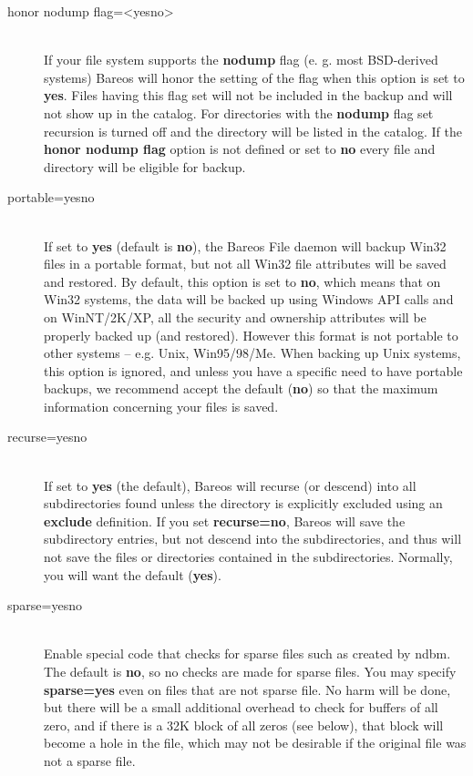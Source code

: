 \begin{description}
\item [honor nodump flag={\textless}yes{\textbar}no{\textgreater}] \hfill \\
   If your file system supports the {\bf nodump} flag (e. g. most
   BSD-derived systems) Bareos will honor the setting of the flag
   when this option is set to {\bf yes}. Files having this flag set
   will not be included in the backup and will not show up in the
   catalog. For directories with the {\bf nodump} flag set recursion
   is turned off and the directory will be listed in the catalog.
   If the {\bf honor nodump flag} option is not defined
   or set to {\bf no} every file and directory will be eligible for
   backup.

\label{portable}
\item [portable=yes{\textbar}no] \hfill \\
   If set to {\bf yes} (default is {\bf no}), the Bareos File daemon will
   backup Win32 files in a portable format, but not all Win32 file
   attributes will be saved and restored.  By default, this option is set
   to {\bf no}, which means that on Win32 systems, the data will be backed
   up using Windows API calls and on WinNT/2K/XP, all the security and
   ownership attributes will be properly backed up (and restored).  However
   this format is not portable to other systems -- e.g.  Unix, Win95/98/Me.
   When backing up Unix systems, this option is ignored, and unless you
   have a specific need to have portable backups, we recommend accept the
   default ({\bf no}) so that the maximum information concerning your files
   is saved.

\item [recurse=yes{\textbar}no] \hfill \\
   If set to {\bf yes} (the default), Bareos will recurse (or descend) into
   all subdirectories found unless the directory is explicitly excluded
   using an {\bf exclude} definition.  If you set {\bf recurse=no}, Bareos
   will save the subdirectory entries, but not descend into the
   subdirectories, and thus will not save the files or directories
   contained in the subdirectories.  Normally, you will want the default
   ({\bf yes}).

\item [sparse=yes{\textbar}no] \hfill \\
   Enable special code that checks for sparse files such as created by
   ndbm.  The default is {\bf no}, so no checks are made for sparse files.
   You may specify {\bf sparse=yes} even on files that are not sparse file.
   No harm will be done, but there will be a small additional overhead to
   check for buffers of all zero, and if there is a 32K block of all zeros
   (see below), that block will become a hole in the file, which
   may not be desirable if the original file was not a sparse file.


\end{description}
